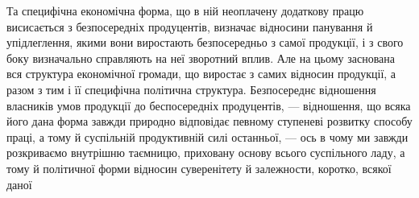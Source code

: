 Та специфічна економічна форма, що в ній неоплачену додаткову працю висисається
з безпосередніх продуцентів, визначає відносини панування й упідлеглення,
якими вони виростають безпосередньо з самої продукції, і з свого боку визначально
справляють на неї зворотний вплив. Але на цьому заснована вся структура економічної
громади, що виростає з самих відносин продукції, а разом з тим і її специфічна
політична структура. Безпосереднє відношення власників умов продукції
до беспосередніх продуцентів, — відношення, що всяка його дана форма завжди
природно відповідає певному ступеневі розвитку способу праці, а тому й суспільній
продуктивній силі останньої, — ось в чому ми завжди розкриваємо
внутрішню таємницю, приховану основу всього суспільного ладу, а тому й політичної
форми відносин суверенітету й залежности, коротко, всякої даної
\parbreak{}  %
